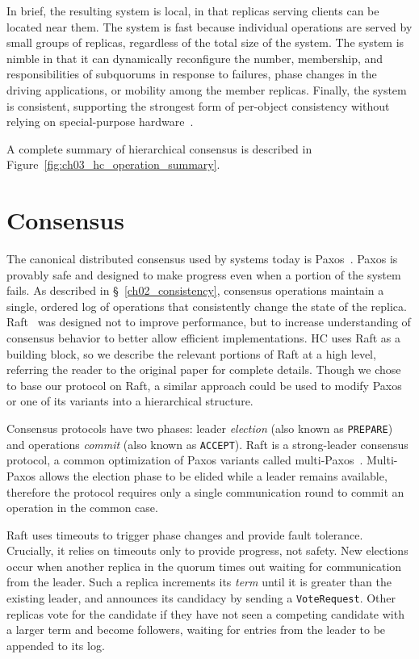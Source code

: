 In brief, the resulting system is local, in that replicas serving clients can be located near them.
The system is fast because individual operations are served by small groups of replicas, regardless of the total size of the system.
The system is nimble in that it can dynamically reconfigure the number, membership, and responsibilities of subquorums in response to failures, phase changes in the driving applications, or mobility among the member replicas.
Finally, the system is consistent, supporting the strongest form of per-object consistency without relying on special-purpose hardware~\cite{fawn,corfu,vcorfu,tango,spanner}.

A complete summary of hierarchical consensus is described in Figure~\ref{fig:ch03_hc_operation_summary}.

\section{Consensus}
\label{ch03_consensus}

The canonical distributed consensus used by systems today is Paxos~\cite{paxos,paxos_simple}.
Paxos is provably safe and designed to make progress even when a portion of the system fails.
As described in \S~\ref{ch02_consistency}, consensus operations maintain a single, ordered log of operations that consistently change the state of the replica.
Raft~\cite{raft} was designed not to improve performance, but to increase understanding of consensus behavior to better allow efficient implementations.
HC uses Raft as a building block, so we describe the relevant portions of Raft at a high level, referring the reader to the original paper for complete details.
Though we chose to base our protocol on Raft, a similar approach could be used to modify Paxos or one of its variants into a hierarchical structure.

Consensus protocols have two phases: leader \emph{election} (also known as \texttt{PREPARE}) and operations \emph{commit} (also known as \texttt{ACCEPT}).
Raft is a strong-leader consensus protocol, a common optimization of Paxos variants called multi-Paxos~\cite{paxos_practical,paxos_live,paxos_systems_builders,spaxos}.
Multi-Paxos allows the election phase to be elided while a leader remains available, therefore the protocol requires only a single communication round to commit an operation in the common case.

Raft uses timeouts to trigger phase changes and provide fault tolerance.
Crucially, it relies on timeouts only to provide progress, not safety.
New elections occur when another replica in the quorum times out waiting for communication from the leader.
Such a replica increments its \emph{term} until it is greater than the existing leader, and announces its candidacy by sending a \texttt{VoteRequest}.
Other replicas vote for the candidate if they have not seen a competing candidate with a larger term and become followers, waiting for entries from the leader to be appended to its log.

